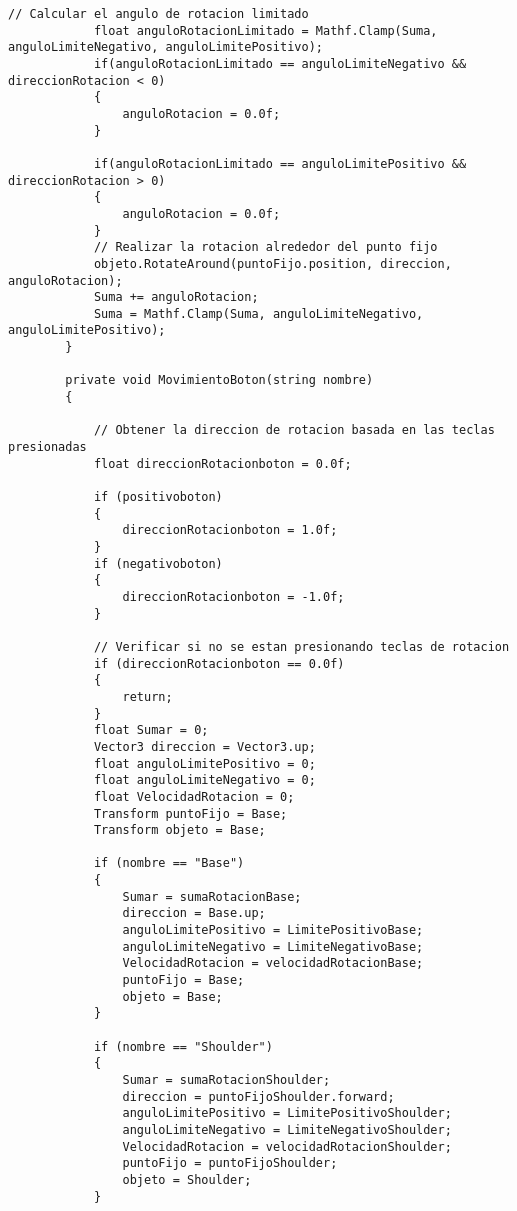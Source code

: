 \begin{lstlisting}[frame=single]
            // Calcular el angulo de rotacion limitado
            float anguloRotacionLimitado = Mathf.Clamp(Suma, anguloLimiteNegativo, anguloLimitePositivo);
            if(anguloRotacionLimitado == anguloLimiteNegativo && direccionRotacion < 0)
            {
                anguloRotacion = 0.0f;
            }
    
            if(anguloRotacionLimitado == anguloLimitePositivo && direccionRotacion > 0)
            {
                anguloRotacion = 0.0f;
            }
            // Realizar la rotacion alrededor del punto fijo
            objeto.RotateAround(puntoFijo.position, direccion, anguloRotacion);
            Suma += anguloRotacion;
            Suma = Mathf.Clamp(Suma, anguloLimiteNegativo, anguloLimitePositivo);
        }
    
        private void MovimientoBoton(string nombre)
        {
            
            // Obtener la direccion de rotacion basada en las teclas presionadas
            float direccionRotacionboton = 0.0f;
    
            if (positivoboton)
            {
                direccionRotacionboton = 1.0f;
            }
            if (negativoboton)
            {
                direccionRotacionboton = -1.0f;
            }
    
            // Verificar si no se estan presionando teclas de rotacion
            if (direccionRotacionboton == 0.0f)
            {
                return;
            }
            float Sumar = 0;
            Vector3 direccion = Vector3.up;
            float anguloLimitePositivo = 0;
            float anguloLimiteNegativo = 0;
            float VelocidadRotacion = 0;
            Transform puntoFijo = Base;
            Transform objeto = Base;
    
            if (nombre == "Base")
            {
                Sumar = sumaRotacionBase;
                direccion = Base.up;
                anguloLimitePositivo = LimitePositivoBase;
                anguloLimiteNegativo = LimiteNegativoBase;
                VelocidadRotacion = velocidadRotacionBase;
                puntoFijo = Base;
                objeto = Base;
            }
    
            if (nombre == "Shoulder")
            {
                Sumar = sumaRotacionShoulder;
                direccion = puntoFijoShoulder.forward;
                anguloLimitePositivo = LimitePositivoShoulder;
                anguloLimiteNegativo = LimiteNegativoShoulder;
                VelocidadRotacion = velocidadRotacionShoulder;
                puntoFijo = puntoFijoShoulder;
                objeto = Shoulder;
            }
    

\end{lstlisting}
